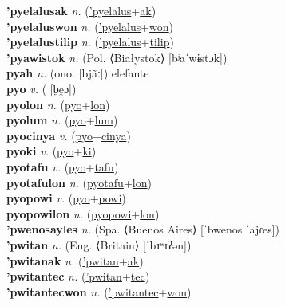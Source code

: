 \textbf{'pyelalusak} \textit{n.} (\hyperref['pyelalus]{'pyelalus}+\hyperref[ak]{ak})
 \label{'pyelalusak} \\
\textbf{'pyelaluswon} \textit{n.} (\hyperref['pyelalus]{'pyelalus}+\hyperref[won]{won})
 \label{'pyelaluswon} \\
\textbf{'pyelalustilip} \textit{n.} (\hyperref['pyelalus]{'pyelalus}+\hyperref[tilip]{tilip})
 \label{'pyelalustilip} \\
\textbf{'pyawistok} \textit{n.} (Pol. ⟨Białystok⟩ [bʲaˈwɨstɔk])
 \label{'pyawistok} \\
\textbf{pyah} \textit{n.} (ono. [bjãː])
elefante \label{pyah} \\
\textbf{pyo} \textit{v.} ( [b̤e̯ɔ])
 \label{pyo} \\
\textbf{pyolon} \textit{n.} (\hyperref[pyo]{pyo}+\hyperref[lon]{lon})
 \label{pyolon} \\
\textbf{pyolum} \textit{n.} (\hyperref[pyo]{pyo}+\hyperref[lum]{lum})
 \label{pyolum} \\
\textbf{pyocinya} \textit{v.} (\hyperref[pyo]{pyo}+\hyperref[cinya]{cinya})
 \label{pyocinya} \\
\textbf{pyoki} \textit{v.} (\hyperref[pyo]{pyo}+\hyperref[ki]{ki})
 \label{pyoki} \\
\textbf{pyotafu} \textit{v.} (\hyperref[pyo]{pyo}+\hyperref[tafu]{tafu})
 \label{pyotafu} \\
\textbf{pyotafulon} \textit{n.} (\hyperref[pyotafu]{pyotafu}+\hyperref[lon]{lon})
 \label{pyotafulon} \\
\textbf{pyopowi} \textit{v.} (\hyperref[pyo]{pyo}+\hyperref[powi]{powi})
 \label{pyopowi} \\
\textbf{pyopowilon} \textit{n.} (\hyperref[pyopowi]{pyopowi}+\hyperref[lon]{lon})
 \label{pyopowilon} \\
\textbf{'pwenosayles} \textit{n.} (Spa. ⟨Buenos Aires⟩ [ˈbwenos ˈajɾes])
 \label{'pwenosayles} \\
\textbf{'pwitan} \textit{n.} (Eng. ⟨Britain⟩ [ˈbɹʷɪʔən])
 \label{'pwitan} \\
\textbf{'pwitanak} \textit{n.} (\hyperref['pwitan]{'pwitan}+\hyperref[ak]{ak})
 \label{'pwitanak} \\
\textbf{'pwitantec} \textit{n.} (\hyperref['pwitan]{'pwitan}+\hyperref[tec]{tec})
 \label{'pwitantec} \\
\textbf{'pwitantecwon} \textit{n.} (\hyperref['pwitantec]{'pwitantec}+\hyperref[won]{won})
 \label{'pwitantecwon} \\
